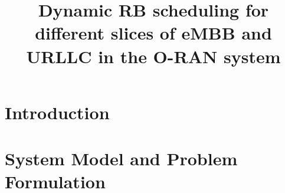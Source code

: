 \documentclass[conference]{IEEEtran}
\begin{document}
\title{Dynamic RB scheduling for different slices of eMBB and URLLC in the O-RAN system \vspace{-.1cm}
}
%

\maketitle

\begin{abstract}

\end{abstract}
\section{Introduction} 


\section{System Model and Problem Formulation}
\end{document}
